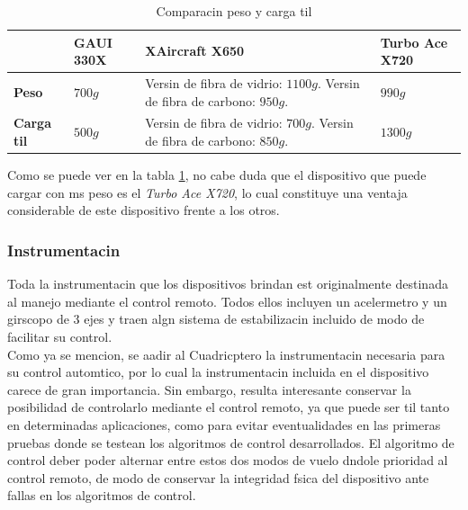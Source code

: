\documentclass[spanish,12pt,a4paper,titlepage]{report}
\begin{document}
\begin{table}[H]
\begin{tabular}{p{40pt}|p{70pt}|p{160pt}|p{110pt}|} 
\cline{2-4}
& \cellcolor[gray]{0.8} \textbf{GAUI 330X} 
& \cellcolor[gray]{0.8} \textbf{XAircraft X650} 
& \cellcolor[gray]{0.8} \textbf{Turbo Ace X720} \\ \cline{2-4} \hline
\multicolumn{1}{|p{40pt}|}{\cellcolor[gray]{0.8}\textbf{Peso}} 
& $700g$ & Versin de fibra de vidrio: $1100g$. Versin de fibra de carbono: $950g$. & $990g$ \\ \hline
\multicolumn{1}{|p{40pt}|}{\cellcolor[gray]{0.8}\textbf{Carga til}} 
& $500g$ & Versin de fibra de vidrio: $700g$. Versin de fibra de carbono: $850g$. & $1300 g$ \\ 
\hline 
\end{tabular}
\caption{Comparacin peso y carga til}
\label{tab:peso}
\end{table}

Como se puede ver en la tabla \ref{tab:peso}, no cabe duda que el dispositivo que puede cargar con ms peso es el \emph{Turbo Ace X720}, lo cual constituye una ventaja considerable de este dispositivo frente a los otros.

\subsubsection*{Instrumentacin}

	Toda la instrumentacin que los dispositivos brindan est originalmente destinada al manejo mediante el control remoto. Todos ellos incluyen un acelermetro y un girscopo de 3 ejes y traen algn sistema de estabilizacin incluido de modo de facilitar su control. \\

	Como ya se mencion, se aadir al Cuadricptero la instrumentacin necesaria para su control automtico, por lo cual la instrumentacin incluida en el dispositivo carece de gran importancia. Sin embargo, resulta interesante conservar la posibilidad de controlarlo mediante el control remoto, ya que puede ser til tanto en determinadas aplicaciones, como para evitar eventualidades en las primeras pruebas donde se testean los algoritmos de control desarrollados. El algoritmo de control deber poder alternar entre estos dos modos de vuelo dndole prioridad al control remoto, de modo de conservar la integridad fsica del dispositivo ante fallas en los algoritmos de control.
\end{document}
